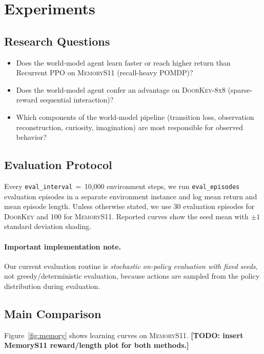 \section{Experiments}

\subsection{Research Questions}

\begin{itemize}
    \item[\textbf{RQ1}] Does the world-model agent learn faster or reach higher return than Recurrent PPO on \textsc{MemoryS11} (recall-heavy POMDP)?
    \item[\textbf{RQ2}] Does the world-model agent confer an advantage on \textsc{DoorKey-8x8} (sparse-reward sequential interaction)?
    \item[\textbf{RQ3}] Which components of the world-model pipeline (transition loss, observation reconstruction, curiosity, imagination) are most responsible for observed behavior?
\end{itemize}

\subsection{Evaluation Protocol}

Every \texttt{eval\_interval}$\,=\,$10{,}000 environment steps, we run \texttt{eval\_episodes} evaluation episodes in a separate environment instance and log mean return and mean episode length. Unless otherwise stated, we use 30 evaluation episodes for \textsc{DoorKey} and 100 for \textsc{MemoryS11}. Reported curves show the seed mean with $\pm 1$ standard deviation shading.

\paragraph{Important implementation note.}
Our current evaluation routine is \emph{stochastic on-policy evaluation with fixed seeds}, not greedy/deterministic evaluation, because actions are sampled from the policy distribution during evaluation.

\subsection{Main Comparison}

Figure~\ref{fig:memory} shows learning curves on \textsc{MemoryS11}.
\textbf{[TODO: insert MemoryS11 reward/length plot for both methods.]}

